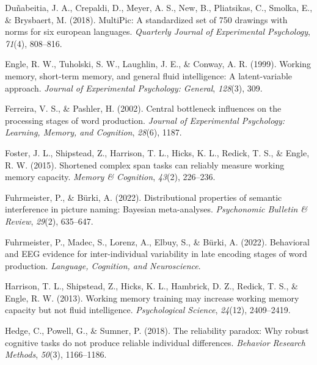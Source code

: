\documentclass[
  man,floatsintext]{apa6}
\newlength{\cslhangindent}
\newlength{\cslentryspacingunit} %
\newenvironment{CSLReferences}[2] %
 {%
  \setlength{\parindent}{0pt}
  \ifodd #1
  \let\oldpar\par
  \def\par{\hangindent=\cslhangindent\oldpar}
  \fi
  \setlength{\parskip}{#2\cslentryspacingunit}
 }%
 {}
\begin{document}
\begin{CSLReferences}{1}{0}
\leavevmode{}%
Duñabeitia, J. A., Crepaldi, D., Meyer, A. S., New, B., Pliatsikas, C., Smolka, E., \& Brysbaert, M. (2018). MultiPic: A standardized set of 750 drawings with norms for six european languages. \emph{Quarterly Journal of Experimental Psychology}, \emph{71}(4), 808--816.

\leavevmode{}%
Engle, R. W., Tuholski, S. W., Laughlin, J. E., \& Conway, A. R. (1999). Working memory, short-term memory, and general fluid intelligence: A latent-variable approach. \emph{Journal of Experimental Psychology: General}, \emph{128}(3), 309.

\leavevmode{}%
Ferreira, V. S., \& Pashler, H. (2002). Central bottleneck influences on the processing stages of word production. \emph{Journal of Experimental Psychology: Learning, Memory, and Cognition}, \emph{28}(6), 1187.

\leavevmode{}%
Foster, J. L., Shipstead, Z., Harrison, T. L., Hicks, K. L., Redick, T. S., \& Engle, R. W. (2015). Shortened complex span tasks can reliably measure working memory capacity. \emph{Memory \& Cognition}, \emph{43}(2), 226--236.

\leavevmode{}%
Fuhrmeister, P., \& Bürki, A. (2022). Distributional properties of semantic interference in picture naming: Bayesian meta-analyses. \emph{Psychonomic Bulletin \& Review}, \emph{29}(2), 635--647.

\leavevmode{}%
Fuhrmeister, P., Madec, S., Lorenz, A., Elbuy, S., \& Bürki, A. (2022). Behavioral and EEG evidence for inter-individual variability in late encoding stages of word production. \emph{Language, Cognition, and Neuroscience}.

\leavevmode{}%
Harrison, T. L., Shipstead, Z., Hicks, K. L., Hambrick, D. Z., Redick, T. S., \& Engle, R. W. (2013). Working memory training may increase working memory capacity but not fluid intelligence. \emph{Psychological Science}, \emph{24}(12), 2409--2419.

\leavevmode{}%
Hedge, C., Powell, G., \& Sumner, P. (2018). The reliability paradox: Why robust cognitive tasks do not produce reliable individual differences. \emph{Behavior Research Methods}, \emph{50}(3), 1166--1186.


\end{CSLReferences}
\end{document}
